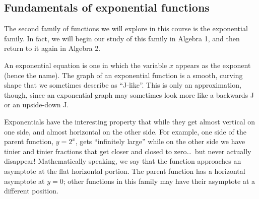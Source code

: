 
\subsection{Fundamentals of exponential functions}

The second family of functions we will explore in this course is the exponential family. In fact, we will begin our study of this family in Algebra 1, and then return to it again in Algebra 2.

An exponential equation is one in which the variable $x$ appears as the exponent (hence the name). The graph of an exponential function is a smooth, curving shape that we sometimes describe as ``J-like''. This is only an approximation, though, since an exponential graph may sometimes look more like a backwards J or an upside-down J.

Exponentials have the interesting property that while they get almost vertical on one side, and almost horizontal on the other side. For example, one side of the parent function, $y=2^x$, gets ``infinitely large'' while on the other side we have tinier and tinier fractions that get closer and closed to zero\ldots\ but never actually disappear! Mathematically speaking, we say that the function approaches an \gls{asymptote} at the flat horizontal portion. The parent function has a horizontal asymptote at $y=0$; other functions in this family may have their asymptote at a different position.


